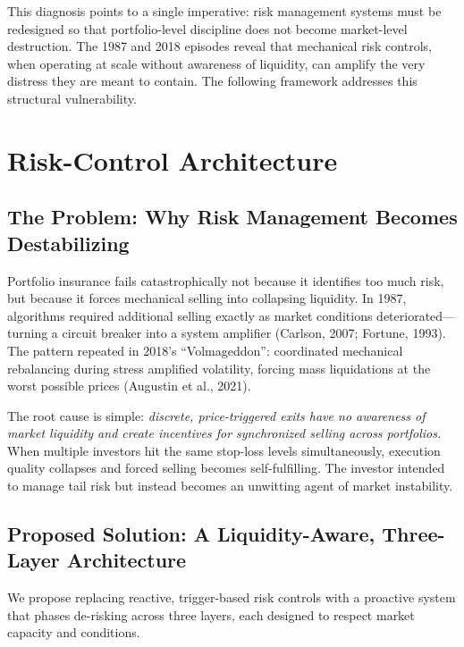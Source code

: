 \documentclass[12pt, a4paper]{article}
\begin{document}

This diagnosis points to a single imperative: risk management systems must be redesigned so that
portfolio-level discipline does not become market-level destruction. The 1987 and 2018 episodes
reveal that mechanical risk controls, when operating at scale without awareness of liquidity, can
amplify the very distress they are meant to contain. The following framework addresses this structural
vulnerability.

\section{Risk-Control Architecture}

\subsection*{The Problem: Why Risk Management Becomes Destabilizing}

Portfolio insurance fails catastrophically not because it identifies too much risk, but because
it forces mechanical selling into collapsing liquidity. In 1987, algorithms required additional
selling exactly as market conditions deteriorated---turning a circuit breaker into a system
amplifier (Carlson, 2007; Fortune, 1993). The pattern repeated in 2018's ``Volmageddon'': coordinated
mechanical rebalancing during stress amplified volatility, forcing mass liquidations at the worst
possible prices (Augustin et al., 2021).

The root cause is simple: \textit{discrete, price-triggered exits have no awareness of market
liquidity and create incentives for synchronized selling across portfolios.} When multiple investors
hit the same stop-loss levels simultaneously, execution quality collapses and forced selling
becomes self-fulfilling. The investor intended to manage tail risk but instead becomes an
unwitting agent of market instability.

\subsection*{Proposed Solution: A Liquidity-Aware, Three-Layer Architecture}

We propose replacing reactive, trigger-based risk controls with a proactive system that phases
de-risking across three layers, each designed to respect market capacity and conditions.
\end{document}
